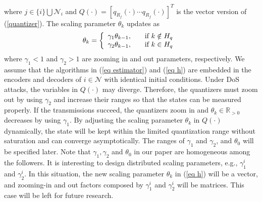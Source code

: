 \documentclass{autart}
\begin{document}
where $j\in \{i\} \bigcup \mathcal N_i$ and $Q(\cdot)=[q_{R_f} (\cdot)\cdots q_{R_f} (\cdot)]^T$ is the vector version of (\ref{quantizer}).  
The scaling parameter $\theta_k$ updates as
\begin{align}\label{eq h}
\theta_k = 
\left\{
\begin{array}{ll}
\gamma_1 \theta_{k-1}, & \quad \text{if $ k   \notin H_q $} \\
\gamma_2 \theta_{k-1}, & \quad \text{if $ k  \in H_q $   }
\end{array}
\right.
\end{align}
where $\gamma_1<1$ and $\gamma_2 >  1$ are 
zooming in and out parameters,
respectively. We assume that the algorithms in (\ref{eq estimator}) and (\ref{eq h}) are embedded in the encoders and decoders of $i\in \mathcal N$ with identical initial conditions. Under DoS attacks, the variables in $Q(\cdot)$ may diverge. Therefore, the quantizers must zoom out by using $\gamma_2$ and increase their ranges so that the states can be measured properly. If the transmissions succeed, the quantizers zoom in and $\theta_k \in \mathbb R_{>0}$ decreases by using $\gamma_1$. By adjusting the scaling parameter $\theta_{k}$ in $Q(\cdot)$ dynamically, the state will be kept within the limited quantization range without saturation and can converge asymptotically.  
The ranges of $\gamma_1$ and $\gamma_2$, and $\theta_0$ will be specified later. Note that $\gamma_1, \gamma_2$ and $\theta_0$ in our paper are homogeneous among the followers. It is interesting to design distributed scaling parameters, e.g., $\gamma_1 ^i$ and $\gamma_2 ^i$. In this situation, the new scaling parameter $\theta_k$  in (\ref{eq h}) will be a vector, and zooming-in and out factors composed by $\gamma_1^i$ and $\gamma_2^i$ will be matrices. This case will be left for future research.
\end{document}
